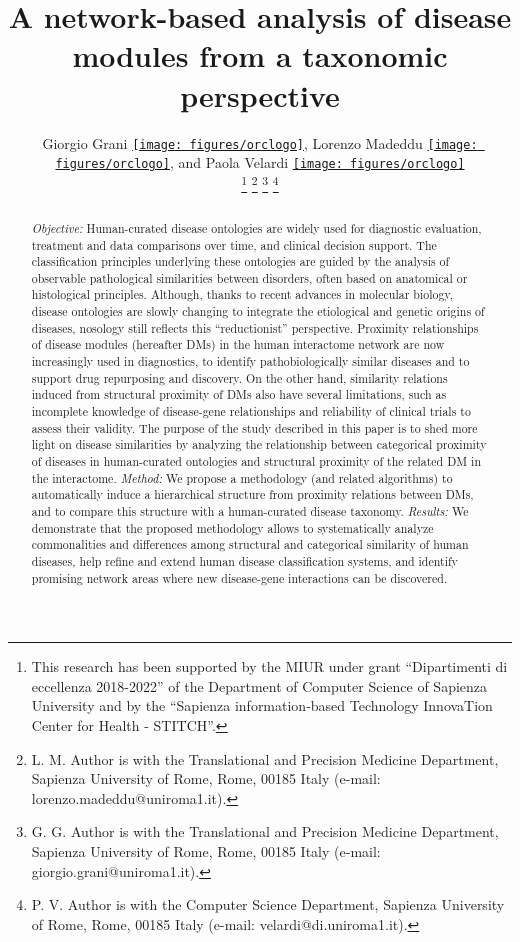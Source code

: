 \documentclass[journal,twoside,web]{ieeecolor}
\newcommand{\orcid}[1]{\href{https://orcid.org/#1}{\texttt{[image: figures/orclogo]}}}
\begin{document}
\title{A network-based analysis of disease modules from a taxonomic perspective}
\author{Giorgio Grani \orcid{0000-0002-0388-1283}, Lorenzo Madeddu \orcid{0000-0002-5702-8691},  and Paola Velardi \orcid{0000-0003-0884-1499}


\thanks{This research has been supported by the MIUR under grant ``Dipartimenti di eccellenza 2018-2022'' of the Department of Computer Science of Sapienza University  and by the ``Sapienza information-based Technology InnovaTion Center for Health - STITCH''.}
\thanks{L. M. Author is with the Translational and Precision Medicine Department, Sapienza University of Rome, Rome, 00185 Italy (e-mail: lorenzo.madeddu@uniroma1.it).}
\thanks{G. G. Author is with the Translational and Precision Medicine Department, Sapienza University of Rome, Rome, 00185 Italy (e-mail: giorgio.grani@uniroma1.it).}
\thanks{P. V. Author is with the Computer Science Department, Sapienza University of Rome, Rome, 00185 Italy (e-mail: velardi@di.uniroma1.it).}
}

\maketitle

\begin{abstract}
\textit{Objective:} Human-curated disease ontologies are widely used for diagnostic evaluation, treatment and data comparisons over time, and clinical decision support. The classification principles underlying these ontologies are guided by the analysis of observable pathological similarities between disorders, often based on anatomical or histological principles. Although, thanks to recent advances in molecular biology, disease ontologies are slowly changing to integrate the etiological and genetic origins of diseases,   nosology still reflects this ``reductionist'' perspective. Proximity relationships of disease modules (hereafter DMs) in the human interactome network are now  increasingly  used in diagnostics,  to identify pathobiologically similar diseases and to support drug repurposing and discovery. On the other hand, similarity relations induced from structural proximity of DMs also have  several limitations, such as incomplete knowledge of disease-gene relationships  and reliability of clinical trials to assess  their validity.  The purpose of the study described in this paper is to shed more light on disease similarities by  analyzing the  relationship  between categorical proximity of diseases in human-curated ontologies and structural proximity of the related DM in the interactome.
\textit{Method:} We propose a methodology (and related algorithms) to automatically induce a    hierarchical structure from proximity relations between DMs, and to  compare this structure with a human-curated disease taxonomy. 
\textit{Results:}  We demonstrate that the proposed methodology allows to systematically analyze  commonalities and differences among structural and categorical  similarity of human diseases,  help refine and extend human disease classification  systems, and identify promising network areas where new disease-gene interactions can be discovered.

\end{abstract}
\end{document}
